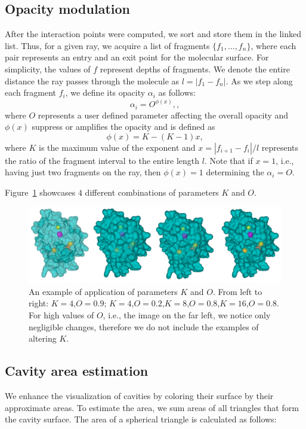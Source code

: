 \subsection{Opacity modulation}
After the interaction points were computed, we sort and store them in the linked list. Thus, for a given ray, we acquire a list of fragments $\{f_1,\ldots,f_n \}$, where each pair represents an entry and an exit point for the molecular surface. For simplicity, the values of $f$ represent depths of fragments. We denote the entire distance the ray passes through the molecule as $l=|f_1-f_n|$. 
As we step along each fragment $f_i$, we define its opacity $\alpha_i$ as follows:
\begin{equation}
  \alpha_i = O^{\phi(x)},
	\label{eq:alphaDist},
\end{equation}	
where $O$ represents a user defined parameter affecting the overall opacity and $\phi(x)$ suppress or amplifies the opacity and is defined as
\begin{equation}
  \phi(x) = K-(K-1)x,
	\label{eq:exponent}
\end{equation}	
where $K$ is the maximum value of the exponent and $x=|f_{i+1}-f_i|/l$ represents the ratio of the fragment interval to the entire length $l$. Note that if $x=1$, i.e., having just two fragments on the ray, then $\phi(x)=1$ determining the $\alpha_i=O$.

Figure~\ref{fig:Oparam} showcases $4$ different combinations of parameters $K$ and $O$.
\begin{figure}[htb]
  \centering
  \includegraphics[width=\textwidth]{image/Oparam.png}
  \caption{An example of application of parameters $K$ and $O$. From left to right: $K=4$,$O=0.9$; $K=4$,$O=0.2$,$K=8$,$O=0.8$,$K=16$,$O=0.8$. For high values of $O$, i.e., the image on the far left, we notice only negligible changes, therefore we do not include the examples of altering $K$.}
	\label{fig:Oparam}
\end{figure}
\subsection{Cavity area estimation}
We enhance the visualization of cavities by coloring their surface by their approximate areas.
To estimate the area, we sum areas of all triangles that form the cavity surface.
The area of a spherical triangle is calculated as follows:

